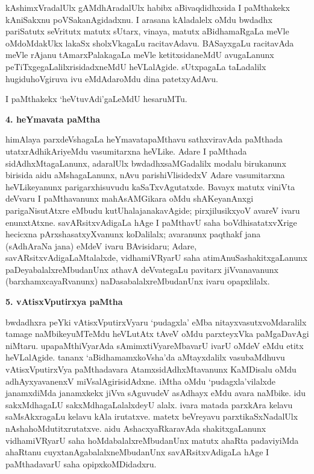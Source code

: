 kAshimxVradalUlx gAMdhAradalUlx habibx aBivaqdidhxsida I paMthakekx kAniSakxnu poVSakanAgidadxnu. I arasana kAladalelx oMdu bwdadhx pariSatutx  seVritutx matutx sUtarx, vinaya, matutx aBidhamaRgaLa meVle oMdoMdakUkx lakaSx sholxVkagaLu racitavAdavu. BASayxgaLu racitavAda meVle rAjanu tAmarxPalakagaLa meVle ketitxsidaneMdU avugaLanunx peTiTxgegaLalilxrisidadxneMdU heVLalAgide. sUtxpagaLa taLadalilx hugiduhoVgiruva ivu eMdAdaroMdu dina patetxyAdAvu.

I paMthakekx `heVtuvAdi'gaLeMdU hesaruMTu.

\begin{center}
{\textbf{\Large 4. heYmavata paMtha}}
\end{center}

himAlaya parxdeVshagaLa heYmavatapaMthavu sathxviravAda paMthada utatxrAdhikAri\-yeMdu vasumitarxna heVLike. Adare I paMthada sidAdhxMtagaLanunx, adaralUlx bwdadhxsaMGadalilx modalu birukanunx birisida aidu aMshagaLanunx, nAvu parishiVlisidedxV Adare vasumitarxna heVLikeyanunx parigarxhisuvudu kaSaTxvAgutatxde. Bavayx matutx viniVta deVvaru I paMthavanunx mahAsAMGikara oMdu shAKeyanAnxgi parigaNisutAtxre eMbudu kutUhalajanakavAgide; pirxjilusikxyoV avareV ivaru enunxtAtxne. savARsitxvAdigaLa hAge I paMthavU saha boVdhisatatxvXrige hecicxna pArxshasatxyXvanunx koDalilalx; avaranunx paqthakf jana (sAdhAraNa jana) eMdeV ivaru BAvisidaru; Adare, savARsitxvAdigaLaMtalalxde, vidhamiVRyarU saha atimAnuSashakitxgaLanunx paDeyabalalxreMbudanUnx athavA deVvategaLu pavitarx jiVvanavanunx (barxhamxcayaRvanunx) naDasabalalxreMbudanUnx ivaru opapxlilalx.

\begin{center}
{\textbf{\Large 5. vAtisxVputirxya paMtha}}
\end{center}

bwdadhxra peYki vAtisxVputirxVyaru `pudagxla' eMba nitayxvasutxvoMdaralilx tamage naMbikeyuMTeMdu heVLutAtx tAveV oMdu parxteyxVka paMgaDavAgi niMtaru. upa\-paMthiVyarAda sAmimxtiVyareMbavarU ivarU oMdeV eMdu etitx heVLalAgide. tananx `aBidhamamxkoVsha'da aMtayxdalilx vasubaMdhuvu vAtisxVputirxVya paMthadavara AtamxsidAdhxMtavanunx KaMDisalu oMdu adhAyxyavanenxV miVsalAgirisidAdxne. iMtha oMdu `pudagxla'vilalxde janamxdiMda janamxkekx jiVva sAguvudeV asAdhayx eMdu avara naMbike. idu sakxMdhagaLU sakxMdhagaLalalxdeyU alalx. ivara matada parxkAra kelavu saMsAkxragaLu kelavu kAla irutatxve. matetx beVreyavu parxtikaSxNadalUlx nAshahoMdutitxrutatxve. aidu AshacxyaRkaravAda shakitxgaLanunx vidhamiVRyarU saha hoMdabalalxreMbudanUnx matutx ahaRta padaviyiMda ahaRtanu cuyxtanAgabalalxneMbudanUnx savARsitxvAdigaLa hAge I paMthadavarU saha opipxkoMDidadxru.

